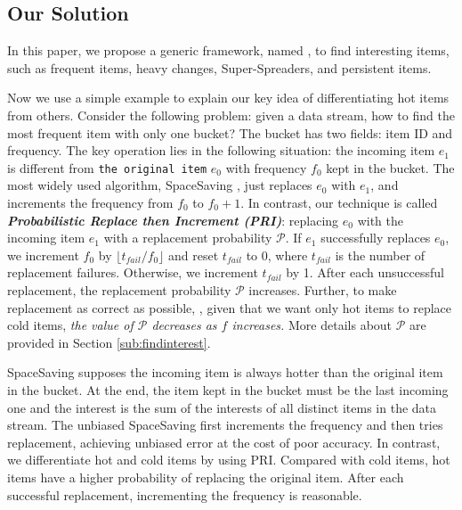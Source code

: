 

 
\presub \uuu
\subsection{Our Solution} 
\postsub \uuu \uuu
%
In this paper, we propose a generic framework, named \aname, to find interesting items, such as frequent items, heavy changes, Super-Spreaders, and persistent items.
%

Now we use a simple example to explain our key idea of differentiating hot items from others. Consider the following problem: given a data stream, how to find the most frequent item with only one bucket?
%
The bucket has two fields: item ID and frequency.
%
The key operation lies in the following situation: the incoming item $e_1$ is different from \texttt{the original item} $e_0$ with frequency $f_0$ kept in the bucket. 
%
The most widely used algorithm, SpaceSaving \cite{spacesaving}, just replaces $e_0$ with $e_1$, and increments the frequency from $f_0$ to $f_0+1$.
%
In contrast, our technique is called \textit{\textbf{Probabilistic Replace then Increment (PRI)}}: replacing $e_0$ with the incoming item $e_1$ with a replacement probability $\mathcal{P}$.
%
If $e_1$ successfully replaces $e_0$, we increment $f_0$ by $\lfloor t_{fail}/f_0\rfloor $ and reset $t_{fail}$ to 0, where $t_{fail}$ is the number of replacement failures. Otherwise, we increment $t_{fail}$ by 1.
After each unsuccessful replacement, the replacement probability $\mathcal{P}$ increases.
%
Further, to make replacement as correct as possible, \ie, given that we want only hot items to replace cold items, \textit{the value of $\mathcal{P}$ decreases as $f$ increases.}
%
More details about $\mathcal{P}$ are provided in Section \ref{sub:findinterest}.


SpaceSaving supposes the incoming item is always hotter than the original item in the bucket. At the end, the item kept in the bucket must be the last incoming one and the interest is the sum of the interests of all distinct items in the data stream. 
The unbiased SpaceSaving \cite{unbiasedsketch} first increments the frequency and then tries replacement, achieving unbiased error at the cost of poor accuracy.
%
In contrast, we differentiate hot and cold items by using PRI. Compared with cold items, hot items have a higher probability of replacing the original item.
%
After each successful replacement, incrementing the frequency is reasonable.
%
%





